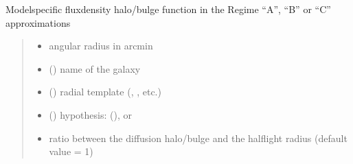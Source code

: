 \documentclass[letterpaper,10pt,english]{sphinxmanual}
\begin{document}

\begin{fulllineitems}
\label{\detokenize{diffsph.profiles:diffsph.profiles.massmodels.Hfd}}
\pysigstartsignatures
{}
\pysigstopsignatures
\sphinxAtStartPar
Model\sphinxhyphen{}specific flux\sphinxhyphen{}density halo/bulge function in the Regime “A”, “B” or “C” approximations
\begin{quote}\begin{description}
\begin{itemize}
\item {} 
\sphinxAtStartPar
{} \textendash{} angular radius in arcmin

\item {} 
\sphinxAtStartPar
{} () \textendash{} name of the galaxy

\item {} 
\sphinxAtStartPar
{} () \textendash{} radial template (, , etc.)

\item {} 
\sphinxAtStartPar
{} () \textendash{} hypothesis:  (),  or 

\item {} 
\sphinxAtStartPar
{} \textendash{} ratio between the diffusion halo/bulge and the half\sphinxhyphen{}light radius (default value = 1)


\end{itemize}
\end{description}
\end{quote}
\end{fulllineitems}
\end{document}
